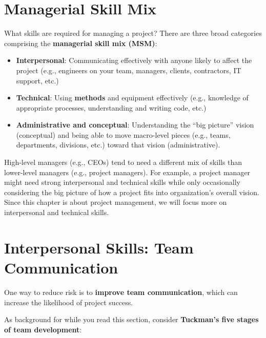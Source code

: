 \section{Managerial Skill Mix}
\marginpar{\msmDef\margindivider} What skills are required for managing a project? There are three broad categories comprising the \textbf{managerial skill mix (MSM)}:
\begin{itemize}
    \item \textbf{Interpersonal}: Communicating effectively with anyone likely to affect the project (e.g., engineers on your team, managers, clients, contractors, IT support, etc.)
    \item \textbf{Technical}: Using \textbf{methods}\marginpar{\methodDef} and equipment effectively (e.g., knowledge of appropriate processes, understanding and writing code, etc.)
    \item \textbf{Administrative and conceptual}: Understanding the ``big picture'' vision (conceptual) and being able to move macro-level pieces (e.g., teams, departments, divisions, etc.) toward that vision (administrative).
\end{itemize}
High-level managers (e.g., CEOs) tend to need a different mix of skills than lower-level managers (e.g., project managers). For example, a project manager might need strong interpersonal and technical skills while only occasionally considering the big picture of how a project fits into organization's overall vision. Since this chapter is about project management, we will focus more on interpersonal and technical skills.

\section{Interpersonal Skills: Team Communication}

One way to reduce risk is to \textbf{improve team communication}, which can increase the likelihood of project success.

As background for while you read this section, consider \textbf{Tuckman's\marginpar{\tuckmanDef} five stages of team development}:

